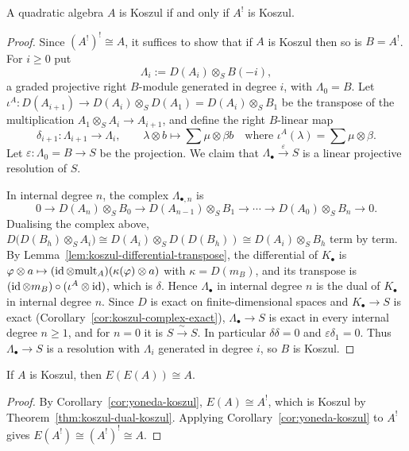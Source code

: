 \begin{theorem}\label{thm:koszul-dual-koszul}
A quadratic algebra $A$ is Koszul if and only if $A^!$ is Koszul.
\end{theorem}

\begin{proof}
Since $(A^!)^!\cong A$, it suffices to show that if $A$ is Koszul then so is $B=A^!$.
For $i\geq0$ put
\[
\Lambda_i:=D(A_i)\otimes_SB(-i),
\]
a graded projective right $B$-module generated in degree $i$, with $\Lambda_0=B$.
Let $\iota^A:D(A_{i+1})\to D(A_i)\otimes_SD(A_1)=D(A_i)\otimes_SB_1$ be the transpose of the multiplication $A_1\otimes_SA_i\to A_{i+1}$, and define the right $B$-linear map
\[
\delta_{i+1}:\Lambda_{i+1}\to\Lambda_i,\qquad\lambda\otimes b\longmapsto\sum\mu\otimes\beta b\quad\text{where }\iota^A(\lambda)=\sum\mu\otimes\beta.
\]
Let $\varepsilon:\Lambda_0=B\to S$ be the projection.
We claim that $\Lambda_\bullet\xrightarrow{\varepsilon}S$ is a linear projective resolution of $S$.

In internal degree $n$, the complex $\Lambda_{\bullet,n}$ is
\[
0\to D(A_n)\otimes_SB_0\to D(A_{n-1})\otimes_SB_1\to\cdots\to D(A_0)\otimes_SB_n\to0.
\]
Dualising the complex above, $D\bigl(D(B_h)\otimes_SA_i\bigr)\cong D(A_i)\otimes_SD(D(B_h))\cong D(A_i)\otimes_SB_h$ term by term.
By Lemma~\ref{lem:koszul-differential-transpose}, the differential of $K_\bullet$ is $\varphi\otimes a\mapsto(\operatorname{id}\otimes\mathrm{mult}_A)(\kappa(\varphi)\otimes a)$ with $\kappa=D(m_B)$, and its transpose is $(\operatorname{id}\otimes m_B)\circ(\iota^A\otimes\operatorname{id})$, which is $\delta$.
Hence $\Lambda_\bullet$ in internal degree $n$ is the dual of $K_\bullet$ in internal degree $n$.
Since $D$ is exact on finite-dimensional spaces and $K_\bullet\to S$ is exact (Corollary~\ref{cor:koszul-complex-exact}), $\Lambda_\bullet\to S$ is exact in every internal degree $n\geq1$, and for $n=0$ it is $S\xrightarrow{\ \sim\ }S$.
In particular $\delta\delta=0$ and $\varepsilon\delta_1=0$.
Thus $\Lambda_\bullet\to S$ is a resolution with $\Lambda_i$ generated in degree $i$, so $B$ is Koszul.
\end{proof}

\begin{corollary}\label{cor:yoneda-double}
If $A$ is Koszul, then $E(E(A))\cong A$.
\end{corollary}

\begin{proof}
By Corollary~\ref{cor:yoneda-koszul}, $E(A)\cong A^!$, which is Koszul by Theorem~\ref{thm:koszul-dual-koszul}.
Applying Corollary~\ref{cor:yoneda-koszul} to $A^!$ gives $E(A^!)\cong(A^!)^!\cong A$.
\end{proof}

